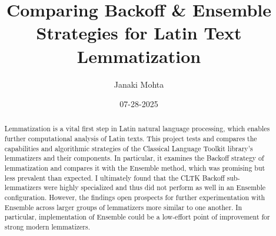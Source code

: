 \documentclass[11pt]{article}
\title{Comparing Backoff \& Ensemble Strategies for Latin Text Lemmatization}
\author{Janaki Mohta}
\date{07-28-2025} %
\begin{document}
\maketitle

\begin{abstract}

Lemmatization is a vital first step in Latin natural language processing, which enables further computational analysis of Latin texts. This project tests and compares the capabilities and algorithmic strategies of the Classical Language Toolkit library’s lemmatizers and their components. In particular, it examines the Backoff strategy of lemmatization and compares it with the Ensemble method, which was promising but less prevalent than expected. I ultimately found that the CLTK Backoff sub-lemmatizers were highly specialized and thus did not perform as well in an Ensemble configuration. However, the findings open prospects for further experimentation with Ensemble across larger groups of lemmatizers more similar to one another. In particular, implementation of Ensemble could be a low-effort point of improvement for strong modern lemmatizers.
  
\end{abstract}
\end{document}
